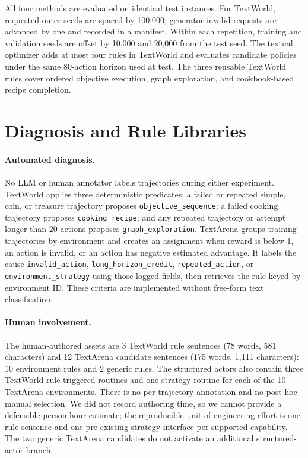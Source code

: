 \documentclass[11pt]{article}
\begin{document}
All four methods are evaluated on identical test instances.
For TextWorld, requested outer seeds are spaced by 100,000; generator-invalid requests are advanced by one and recorded in a manifest.
Within each repetition, training and validation seeds are offset by 10,000 and 20,000 from the test seed.
The textual optimizer adds at most four rules in TextWorld and evaluates candidate policies under the same 80-action horizon used at test.
The three reusable TextWorld rules cover ordered objective execution, graph exploration, and cookbook-based recipe completion.

\section{Diagnosis and Rule Libraries}

\paragraph{Automated diagnosis.}
No LLM or human annotator labels trajectories during either experiment.
TextWorld applies three deterministic predicates: a failed or repeated simple, coin, or treasure trajectory proposes \texttt{objective\_sequence}; a failed cooking trajectory proposes \texttt{cooking\_recipe}; and any repeated trajectory or attempt longer than 20 actions proposes \texttt{graph\_exploration}.
TextArena groups training trajectories by environment and creates an assignment when reward is below 1, an action is invalid, or an action has negative estimated advantage.
It labels the cause \texttt{invalid\_action}, \texttt{long\_horizon\_credit}, \texttt{repeated\_action}, or \texttt{environment\_strategy} using those logged fields, then retrieves the rule keyed by environment ID.
These criteria are implemented without free-form text classification.

\paragraph{Human involvement.}
The human-authored assets are 3 TextWorld rule sentences (78 words, 581 characters) and 12 TextArena candidate sentences (175 words, 1,111 characters): 10 environment rules and 2 generic rules.
The structured actors also contain three TextWorld rule-triggered routines and one strategy routine for each of the 10 TextArena environments.
There is no per-trajectory annotation and no post-hoc manual selection.
We did not record authoring time, so we cannot provide a defensible person-hour estimate; the reproducible unit of engineering effort is one rule sentence and one pre-existing strategy interface per supported capability.
The two generic TextArena candidates do not activate an additional structured-actor branch.
\end{document}
